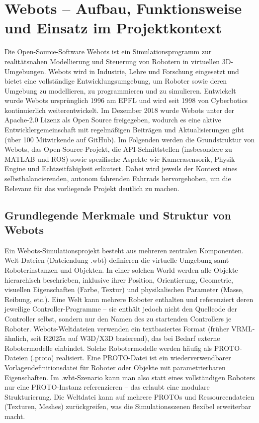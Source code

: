 \documentclass[11pt]{article}
\begin{document}
\section{Webots – Aufbau, Funktionsweise und Einsatz im Projektkontext}

Die Open-Source-Software Webots ist ein Simulationsprogramm zur realitätsnahen Modellierung und Steuerung von Robotern in virtuellen 3D-Umgebungen. Webots wird in Industrie, Lehre und Forschung eingesetzt und bietet eine vollständige Entwicklungsumgebung, um Roboter sowie deren Umgebung zu modellieren, zu programmieren und zu simulieren. Entwickelt wurde Webots ursprünglich 1996 am EPFL und wird seit 1998 von Cyberbotics kontinuierlich weiterentwickelt. Im Dezember 2018 wurde Webots unter der Apache-2.0 Lizenz als Open Source freigegeben, wodurch es eine aktive Entwicklergemeinschaft mit regelmäßigen Beiträgen und Aktualisierungen gibt (über 100 Mitwirkende auf GitHub). Im Folgenden werden die Grundstruktur von Webots, das Open-Source-Projekt, die API-Schnittstellen (insbesondere zu MATLAB und ROS) sowie spezifische Aspekte wie Kamerasensorik, Physik-Engine und Echtzeitfähigkeit erläutert. Dabei wird jeweils der Kontext eines selbstbalancierenden, autonom fahrenden Fahrrads hervorgehoben, um die Relevanz für das vorliegende Projekt deutlich zu machen.


\subsection{Grundlegende Merkmale und Struktur von Webots}
Ein Webots-Simulationsprojekt besteht aus mehreren zentralen Komponenten. Welt-Dateien (Dateiendung .wbt)
definieren die virtuelle Umgebung samt \cite{webotsGithub} Roboterinstanzen und Objekten. In einer solchen World werden alle 
Objekte hierarchisch beschrieben, inklusive ihrer Position, Orientierung, Geometrie, visuellen Eigenschaften
(Farbe, Textur) und physikalischen Parameter (Masse, Reibung, etc.). Eine Welt kann mehrere Roboter enthalten
und referenziert deren jeweilige Controller-Programme – sie enthält jedoch nicht den Quellcode der Controller selbst, 
sondern nur den Namen des zu startenden Controllers je Roboter. Webots-Weltdateien verwenden ein textbasiertes Format 
(früher VRML-ähnlich, seit R2025a auf W3D/X3D basierend), das bei Bedarf externe Robotermodelle einbindet. Solche Robotermodelle
werden häufig als PROTO-Dateien (.proto) realisiert. Eine PROTO-Datei ist ein wiederverwendbarer Vorlagendefinitionsdatei für Roboter
oder Objekte mit parametrierbaren Eigenschaften. Im .wbt-Szenario kann man also statt eines vollständigen Roboters nur eine 
PROTO-Instanz referenzieren – das erlaubt eine modulare Strukturierung. Die Weltdatei kann auf mehrere PROTOs und Ressourcendateien 
(Texturen, Meshes) zurückgreifen, was die Simulationsszenen flexibel erweiterbar macht.
\end{document}
